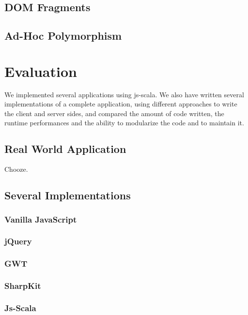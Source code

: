 \documentclass[preprint]{sigplanconf}
\begin{document}
\subsection{DOM Fragments}

\subsection{Ad-Hoc Polymorphism}

\section{Evaluation}
\label{validation}

We implemented several applications using js-scala. We also have written several implementations of a complete
application, using different approaches to write the client and server sides, and compared the amount of code
written, the runtime performances and the ability to modularize the code and to maintain it.

\subsection{Real World Application}

Chooze.

\subsection{Several Implementations}

\subsubsection{Vanilla JavaScript}

\subsubsection{jQuery}

\subsubsection{GWT}

\subsubsection{SharpKit}

\subsubsection{Js-Scala}
\end{document}
